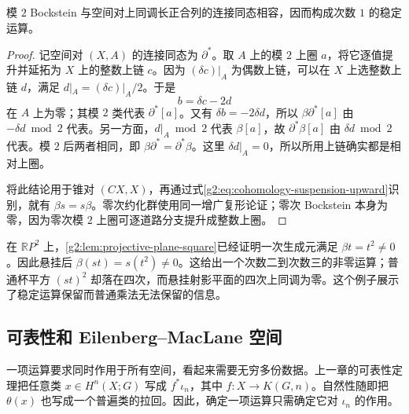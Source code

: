 \begin{proposition}\label{g2:prop:bockstein-suspension}
	模 \(2\) Bockstein 与空间对上同调长正合列的连接同态相容，因而构成次数 \(1\) 的稳定运算。
\end{proposition}
\begin{proof}
	记空间对 \((X,A)\) 的连接同态为 \(\partial^*\)。取 \(A\) 上的模 \(2\) 上圈 \(a\)，将它逐值提升并延拓为 \(X\) 上的整数上链 \(c\)。因为 \((\delta c)|_A\) 为偶数上链，可以在 \(X\) 上选整数上链 \(d\)，满足 \(d|_A=(\delta c)|_A/2\)。于是
	\[
		b=\delta c-2d
	\]
	在 \(A\) 上为零；其模 \(2\) 类代表 \(\partial^*[a]\)。又有 \(\delta b=-2\delta d\)，所以 \(\beta\partial^*[a]\) 由 \(-\delta d\bmod2\) 代表。另一方面，\(d|_A\bmod2\) 代表 \(\beta[a]\)，故 \(\partial^*\beta[a]\) 由 \(\delta d\bmod2\) 代表。模 \(2\) 后两者相同，即 \(\beta\partial^*=\partial^*\beta\)。这里 \(\delta d|_A=0\)，所以所用上链确实都是相对上圈。

	将此结论用于锥对 \((CX,X)\)，再通过式\eqref{g2:eq:cohomology-suspension-upward}识别，就有 \(\beta s=s\beta\)。零次约化群使用同一增广复形论证；零次 Bockstein 本身为零，因为零次模 \(2\) 上圈可逐道路分支提升成整数上圈。
\end{proof}

在 \(\mathbb RP^2\) 上，\cref{g2:lem:projective-plane-square}已经证明一次生成元满足 \(\beta t=t^2\ne0\)。因此悬挂后 \(\beta(st)=s(t^2)\ne0\)。这给出一个次数二到次数三的非零运算；普通杯平方 \((st)^2\) 却落在四次，而悬挂射影平面的四次上同调为零。这个例子展示了稳定运算保留而普通乘法无法保留的信息。

\subsection{可表性和 Eilenberg–MacLane 空间}
\label{g2:subsec:1301:03}

一项运算要求同时作用于所有空间，看起来需要无穷多份数据。上一章的可表性定理把任意类 \(x\in H^n(X;G)\) 写成 \(f^*\iota_n\)，其中 \(f:X\to K(G,n)\)。自然性随即把 \(\theta(x)\) 也写成一个普遍类的拉回。因此，确定一项运算只需确定它对 \(\iota_n\) 的作用。

